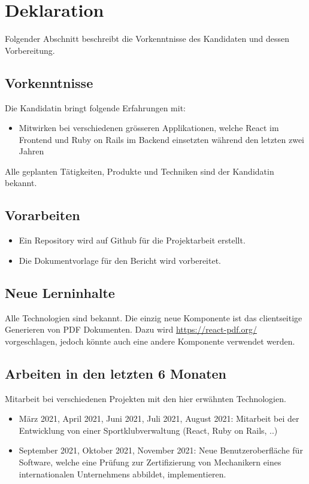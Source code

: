 \chapter{Deklaration}

Folgender Abschnitt beschreibt die Vorkenntnisse des Kandidaten und dessen Vorbereitung.

\section{Vorkenntnisse}

Die Kandidatin bringt folgende Erfahrungen mit:
\begin{itemize}
  \item Mitwirken bei verschiedenen grösseren Applikationen, welche React im Frontend und Ruby on Rails im Backend einsetzten während den letzten zwei Jahren
\end{itemize}

Alle geplanten Tätigkeiten, Produkte und Techniken sind der Kandidatin bekannt.

\section{Vorarbeiten}
\begin{itemize}
  \item Ein Repository wird auf Github für die Projektarbeit erstellt.
  \item Die Dokumentvorlage für den Bericht wird vorbereitet.
\end{itemize}

\section{Neue Lerninhalte}
Alle Technologien sind bekannt. Die einzig neue Komponente ist das clientseitige Generieren von PDF Dokumenten. Dazu wird \url{https://react-pdf.org/} vorgeschlagen, jedoch könnte auch eine andere Komponente verwendet werden.

\section{Arbeiten in den letzten 6 Monaten}
Mitarbeit bei verschiedenen Projekten mit den hier erwähnten Technologien.
\begin{itemize}
  \item März 2021, April 2021, Juni 2021, Juli 2021, August 2021: Mitarbeit bei der Entwicklung von einer Sportklubverwaltung (React, Ruby on Rails, ..)
  \item September 2021, Oktober 2021, November 2021: Neue Benutzeroberfläche für Software, welche eine Prüfung zur Zertifizierung von Mechanikern eines internationalen Unternehmens abbildet, implementieren.
\end{itemize}
